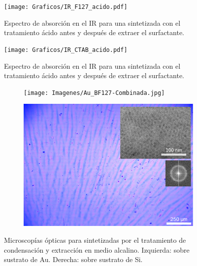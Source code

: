     		\begin{figure}
			\centering
			\texttt{[image: Graficos/IR\_F127\_acido.pdf]}
			\caption[FTIR \pdmF\space tratamiento ácido.]{Espectro de absorción en el IR para una \pdmF\space sintetizada con el tratamiento ácido antes y después de extraer el surfactante.}
			\label{fig:IR_F127_acido}
		    \end{figure}
    	

    		\begin{figure}
			\centering
			\texttt{[image: Graficos/IR\_CTAB\_acido.pdf]}
			\caption[FTIR \pdmC\space tratamiento ácido.]{Espectro de absorción en el IR para una \pdmC\space sintetizada con el tratamiento ácido antes y después de extraer el surfactante.}
			\label{fig:IR_CTAB_acido}
			\end{figure}
	
    	

    		\begin{figure}
 	   	    \begin{subfigure}{0.49\textwidth}
	       	\texttt{[image: Imagenes/Au\_BF127-Combinada.jpg]}
	   		\end{subfigure}
	   		\begin{subfigure}{0.49\textwidth}
	   	    \includegraphics[width=\textwidth]{Imagenes/Si_BF127-Combinada.jpg}
	   		\end{subfigure}
			 \caption[Microscopía óptica \pdmF tratamiento en medio alcalino.]{Microscopías ópticas para \pdmF\space sintetizadas por el tratamiento de condensación y extracción en medio alcalino. Izquierda: sobre sustrato de Au. Derecha: sobre sustrato de Si.}
			 \label{fig:Microscopia_F127_basico}	
		     \end{figure}

